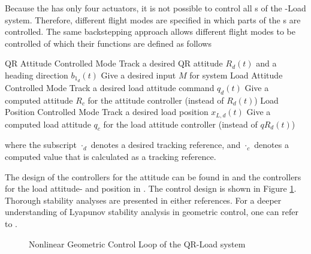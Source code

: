 Because the  has only four actuators, it is not possible to control all s of the -Load system. Therefore, different flight modes are specified in which parts of the s are controlled. The same backstepping approach allows different flight modes to be controlled of which their functions are defined as follows
\begin{outline}
\1 QR Attitude Controlled Mode 
\2 Track a desired QR attitude $ R_d(t) $ and a heading direction $ b_{1_d}(t) $
\2 Give a desired input $ M $ for system
\1 Load Attitude Controlled Mode 
\2 Track a desired load attitude command $ q_d(t) $
\2 Give a computed  attitude $ R_c $ for the  attitude controller (instead of $ R_d(t) $)
\1 Load Position Controlled Mode
\2 Track a desired load position $ x_{L,d}(t) $
\2 Give a computed load attitude $ q_c $ for the load attitude controller (instead of $qR_d(t) $)
\end{outline}
where the subscript $ \cdot_d $ denotes a desired tracking reference, and $ \cdot_c $ denotes a computed value that is calculated as a tracking reference. 

The design of the controllers for the  attitude can be found in \cite{Lee21010} and the controllers for the load attitude- and position in \cite{Sreenath2013c}. The control design is shown in Figure \ref{fig:con.loop}. Thorough stability analyses are presented in either references. For a deeper understanding of Lyapunov stability analysis in geometric control, one can refer to \cite{Bullo2005}.

\begin{figure}[h!]
	\centering
	\caption{Nonlinear Geometric Control Loop of the QR-Load system\label{fig:con.loop}}
\end{figure}		

